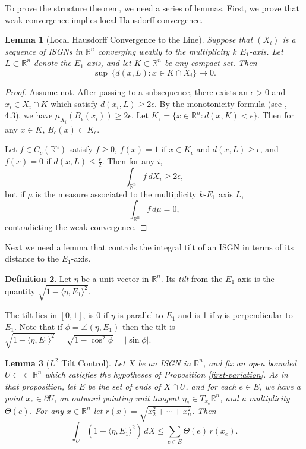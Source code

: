 \documentclass[11pt,reqno,twoside]{amsart}
\newtheorem{lemma}{Lemma}
\theoremstyle{definition}
\newtheorem{definition}[lemma]{Definition}
\begin{document}
To prove the structure theorem, we need a series of lemmas. First, we prove that weak convergence implies local Hausdorff convergence.

\begin{lemma}[Local Hausdorff Convergence to the Line] \label{hausdorff-convergence}
    Suppose that $(X_i)$ is a sequence of ISGNs in $\mathbb{R}^n$ converging weakly to the multiplicity $k$ $E_1$-axis. Let $L \subset \mathbb{R}^n$ denote the $E_1$ axis, and let $K \subset \mathbb{R}^n$ be any compact set. Then
    \[\sup \, \{d(x,L): x \in K \cap X_i\} \to 0.\]
\end{lemma}

\begin{proof}
Assume not. After passing to a subsequence, there exists an $\epsilon > 0$ and $x_i \in X_i \cap K$ which satisfy $d(x_i,L) \geq 2\epsilon.$ By the monotonicity formula (see \cite{simon_gmt}, 4.3), we have $\mu_{X_i}(B_\epsilon(x_i)) \geq 2\epsilon$. Let $K_\epsilon = \{x \in \mathbb{R}^n: d(x,K) < \epsilon\}$. Then for any $x \in K$, $B_\epsilon(x) \subset K_\epsilon$.

Let $f \in C_c(\mathbb{R}^n)$ satisfy $f \geq 0$, $f(x) = 1$ if $x \in K_\epsilon$ and $d(x,L) \geq \epsilon$, and $f(x) = 0$ if $d(x,L) \leq \frac{\epsilon}{2}$. Then for any $i$,
\[\int_{\mathbb{R}^n} f \, dX_i \geq 2\epsilon,\]
but if $\mu$ is the measure associated to the multiplicity $k$-$E_1$ axis $L$,
\[\int_{\mathbb{R}^n} f \, d\mu = 0,\]
contradicting the weak convergence.
\end{proof}

Next we need a lemma that controls the integral tilt of an ISGN in terms of its distance to the $E_1$-axis.

\begin{definition}
    Let $\eta$ be a unit vector in $\mathbb{R}^n$. Its \emph{tilt} from the $E_1$-axis is the quantity $\sqrt{1 - \langle \eta,E_1\rangle^2}.$
\end{definition}

The tilt lies in $[0,1]$, is $0$ if $\eta$ is parallel to $E_1$ and is 1 if $\eta$ is perpendicular to $E_1$. Note that if $\phi = \angle(\eta, E_1)$ then the tilt is $\sqrt{1 - \langle\eta,E_1\rangle^2} = \sqrt{1 - \cos^2 \phi} = |\sin \phi|.$

\begin{lemma}[$L^2$ Tilt Control] \label{tilt-control}
Let $X$ be an ISGN in $\mathbb{R}^n$, and fix an open bounded $U \subset\subset \mathbb{R}^n$ which satisfies the hypotheses of Proposition \ref{first-variation}. As in that proposition, let $E$ be the set of ends of $X \cap U$, and for each $e \in E$, we have a point $x_e \in \partial U$, an outward pointing unit tangent $\eta_e \in T_{x_e}\mathbb{R}^n$, and a multiplicity $\Theta(e)$. For any $x \in \mathbb{R}^n$ let $r(x) = \sqrt{x_2^2 + \cdots + x_n^2}.$ Then
\[\int_U (1 - \langle \eta,E_1\rangle^2) \, dX \leq \sum_{e \in E} \Theta(e) \, r(x_e).\]
\end{lemma}
\end{document}
